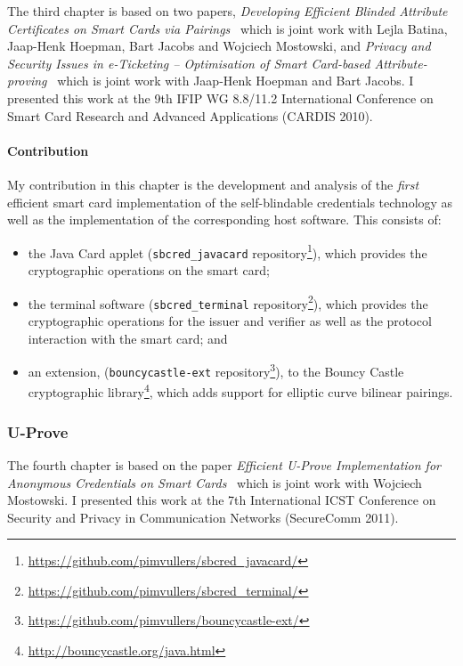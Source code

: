 The third chapter is based on two papers, \emph{Developing Efficient Blinded
Attribute Certificates on Smart Cards via Pairings}~\cite{BatinaHJMV10} which
is joint work with Lejla Batina, Jaap-Henk Hoepman, Bart Jacobs and Wojciech
Mostowski, and \emph{Privacy and Security Issues in e-Ticketing -- Optimisation
of Smart Card-based Attribute-proving}~\cite{HoepmanJV10} which is joint work
with Jaap-Henk Hoepman and Bart Jacobs. I presented this work at the 9th IFIP WG
8.8/11.2 International Conference on Smart Card Research and Advanced
Applications (CARDIS 2010).

\paragraph{Contribution}

My contribution in this chapter is the development and analysis of the
\emph{first} efficient smart card implementation of the self-blindable
credentials technology as well as the implementation of the corresponding host
software. This consists of:
\begin{itemize}
  \item the Java Card applet (\texttt{sbcred\_javacard} repository\footnote{%
    \url{https://github.com/pimvullers/sbcred_javacard/}}),
    which provides the cryptographic operations on the smart card;
  \item the terminal software (\texttt{sbcred\_terminal} repository\footnote{%
    \url{https://github.com/pimvullers/sbcred_terminal/}}),
    which provides the cryptographic operations for the issuer and verifier as
    well as the protocol interaction with the smart card; and
  \item an extension, (\texttt{bouncycastle-ext} repository\footnote{%
    \url{https://github.com/pimvullers/bouncycastle-ext/}}),
    to the Bouncy Castle cryptographic library\footnote{%
    \url{http://bouncycastle.org/java.html}}, which adds support for elliptic
    curve bilinear pairings.
\end{itemize}

\subsubsection{U-Prove}

The fourth chapter is based on the paper \emph{Efficient U-Prove Implementation
for Anonymous Credentials on Smart Cards}~\cite{MostowskiVullers11} which is
joint work with Wojciech Mostowski. I presented this work at the 7th
International ICST Conference on Security and Privacy in Communication Networks
(SecureComm 2011).

